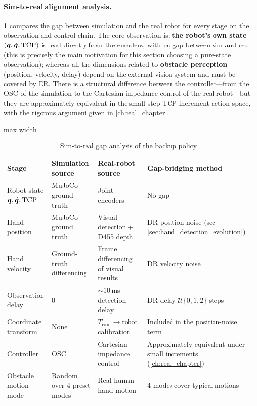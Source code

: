 \paragraph{Sim-to-real alignment analysis.} \cref{tab:backup_sim2real} compares the gap between simulation and the real robot for every stage on the observation and control chain. The core observation is: \textbf{the robot's own state} $(\bm{q}, \dot{\bm{q}}, \text{TCP})$ is read directly from the encoders, with no gap between sim and real (this is precisely the main motivation for this section choosing a pure-state observation); whereas all the dimensions related to \textbf{obstacle perception} (position, velocity, delay) depend on the external vision system and must be covered by DR. There is a structural difference between the controller---from the OSC of the simulation to the Cartesian impedance control of the real robot---but they are approximately equivalent in the small-step TCP-increment action space, with the rigorous argument given in \cref{ch:real_chapter}.

\begin{table}[htbp]
  \centering
  \caption{Sim-to-real gap analysis of the backup policy}
  \label{tab:backup_sim2real}
  \footnotesize
  \begin{adjustbox}{max width=\textwidth}
  \begin{tabular}{@{}llll@{}}
    \toprule
    Stage & Simulation source & Real-robot source & Gap-bridging method \\
    \midrule
    Robot state $\bm{q}, \dot{\bm{q}}, \text{TCP}$ & MuJoCo ground truth & Joint encoders & No gap \\
    Hand position & MuJoCo ground truth & Visual detection $+$ D455 depth & DR position noise (see \cref{sec:hand_detection_evolution}) \\
    Hand velocity & Ground-truth differencing & Frame differencing of visual results & DR velocity noise \\
    Observation delay & $0$ & $\sim 10$\,ms detection delay & DR delay $\mathcal{U}\{0,1,2\}$ steps \\
    Coordinate transform & None & $T_\text{cam}\!\to\!\text{robot}$ calibration & Included in the position-noise term \\
    Controller & OSC & Cartesian impedance control & Approximately equivalent under small increments (\cref{ch:real_chapter}) \\
    Obstacle motion mode & Random over 4 preset modes & Real human-hand motion & 4 modes cover typical motions \\
    \bottomrule
  \end{tabular}
  \end{adjustbox}
\end{table}

